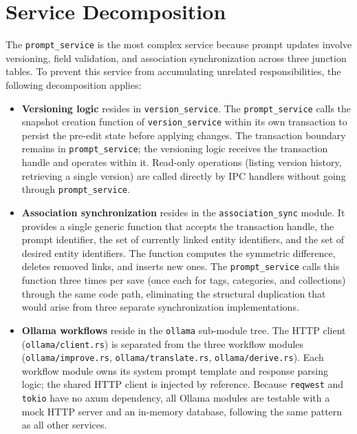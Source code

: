 \documentclass[a4paper, 11pt, oneside]{report}
\begin{document}
\section{Service Decomposition}
\label{sec:service-decomposition}

The \texttt{prompt\_service} is the most complex service because prompt
updates involve versioning, field validation, and association
synchronization across three junction tables.  To prevent this service
from accumulating unrelated responsibilities, the following decomposition
applies:

\begin{itemize}
  \item \textbf{Versioning logic} resides in
        \texttt{version\_service}.  The \texttt{prompt\_service} calls
        the snapshot creation function of \texttt{version\_service}
        within its own transaction to persist the pre-edit state before
        applying changes.  The transaction boundary remains in
        \texttt{prompt\_service}; the versioning logic receives the
        transaction handle and operates within it.  Read-only operations
        (listing version history, retrieving a single version) are
        called directly by IPC handlers without going through
        \texttt{prompt\_service}.
  \item \textbf{Association synchronization} resides in the
        \texttt{association\_sync} module.  It provides a single generic
        function that accepts the transaction handle, the prompt identifier,
        the set of currently linked entity identifiers, and the set of
        desired entity identifiers.  The function computes the symmetric
        difference, deletes removed links, and inserts new ones.  The
        \texttt{prompt\_service} calls this function three times per save
        (once each for tags, categories, and collections) through the same
        code path, eliminating the structural duplication that would arise
        from three separate synchronization implementations.
  \item {\relax \textbf{Ollama workflows} reside in the
        \texttt{ollama} sub-module tree.  The HTTP client
        (\texttt{ollama/\-client.rs}) is separated from the
        three workflow modules
        (\texttt{ollama/\-improve.rs},
        \texttt{ollama/\-translate.rs},
        \texttt{ollama/\-derive.rs}).  Each workflow module
        owns its system prompt template and response parsing logic;
        the shared HTTP client is injected by reference.  Because
        \texttt{reqwest} and \texttt{tokio} have no axum dependency,
        all Ollama modules are testable with a mock HTTP server and an
        in-memory database, following the same pattern as all other
        services.\par}
\end{itemize}
\end{document}

